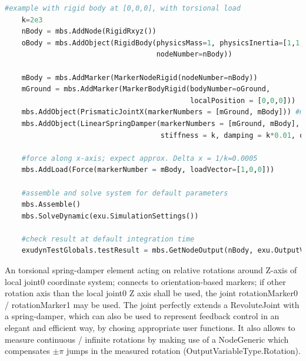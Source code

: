 \begin{lstlisting}[language=Python, firstnumber=1]
    #example with rigid body at [0,0,0], with torsional load
    k=2e3
    nBody = mbs.AddNode(RigidRxyz())
    oBody = mbs.AddObject(RigidBody(physicsMass=1, physicsInertia=[1,1,1,0,0,0], 
                                    nodeNumber=nBody))
    
    mBody = mbs.AddMarker(MarkerNodeRigid(nodeNumber=nBody))
    mGround = mbs.AddMarker(MarkerBodyRigid(bodyNumber=oGround, 
                                            localPosition = [0,0,0]))
    mbs.AddObject(PrismaticJointX(markerNumbers = [mGround, mBody])) #motion along ground X-axis
    mbs.AddObject(LinearSpringDamper(markerNumbers = [mGround, mBody], axisMarker0=[1,0,0],
                                     stiffness = k, damping = k*0.01, offset = 0))

    #force along x-axis; expect approx. Delta x = 1/k=0.0005
    mbs.AddLoad(Force(markerNumber = mBody, loadVector=[1,0,0])) 

    #assemble and solve system for default parameters
    mbs.Assemble()
    mbs.SolveDynamic(exu.SimulationSettings())
    
    #check result at default integration time
    exudynTestGlobals.testResult = mbs.GetNodeOutput(nBody, exu.OutputVariableType.Displacement)[0]
\end{lstlisting}

\newpage


\label{sec:item:ObjectConnectorTorsionalSpringDamper}
An torsional spring-damper element acting on relative rotations around Z-axis of local joint0 coordinate system; connects to orientation-based markers; if other rotation axis than the local joint0 Z axis shall be used, the joint rotationMarker0 / rotationMarker1 may be used. The joint perfectly extends a RevoluteJoint with a spring-damper, which can also be used to represent feedback control in an elegant and efficient way, by chosing appropriate user functions. It also allows to measure continuous / infinite rotations by making use of a NodeGeneric which compensates $\pm \pi$ jumps in the measured rotation (OutputVariableType.Rotation).
\vspace{12pt}\\

